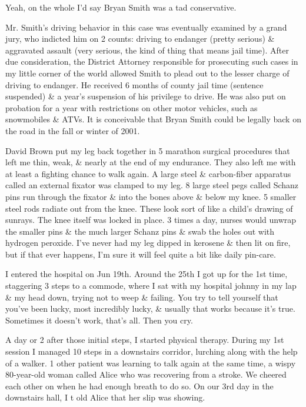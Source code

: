 \documentclass{article}
\numberwithin{equation}{section}
\begin{document}
Yeah, on the whole I'd say Bryan Smith was a tad conservative.

 Mr. Smith's driving behavior in this case was eventually examined by a grand jury, who indicted him on 2 counts: driving to endanger (pretty serious) \& aggravated assault (very serious, the kind of thing that means jail time). After due consideration, the District Attorney responsible for prosecuting such cases in my little corner of the world allowed Smith to plead out to the lesser charge of driving to endanger. He received 6 months of county jail time (sentence suspended) \& a year's suspension of his privilege to drive. He was also put on probation for a year with restrictions on other motor vehicles, such as snowmobiles \& ATVs. It is conceivable that Bryan Smith could be legally back on the road in the fall or winter of 2001.

 David Brown put my leg back together in 5 marathon surgical procedures that left me thin, weak, \& nearly at the end of my endurance. They also left me with at least a fighting chance to walk again. A large steel \& carbon-fiber apparatus called an external fixator was clamped to my leg. 8 large steel pegs called Schanz pins run through the fixator \& into the bones above \& below my knee. 5 smaller steel rods radiate out from the knee. These look sort of like a child's drawing of sunrays. The knee itself was locked in place. 3 times a day, nurses would unwrap the smaller pins \& the much larger Schanz pins \& swab the holes out with hydrogen peroxide. I've never had my leg dipped in kerosene \& then lit on fire, but if that ever happens, I'm sure it will feel quite a bit like daily pin-care.

I entered the hospital on Jun 19th. Around the 25th I got up for the 1st time, staggering 3 steps to a commode, where I sat with my hospital johnny in my lap \& my head down, trying not to weep \& failing. You try to tell yourself that you've been lucky, most incredibly lucky, \& usually that works because it's true. Sometimes it doesn't work, that's all. Then you cry.

A day or 2 after those initial steps, I started physical therapy. During my 1st session I managed 10 steps in a downstairs corridor, lurching along with the help of a walker. 1 other patient was learning to talk again at the same time, a wispy 80-year-old woman called Alice who was recovering from a stroke. We cheered each other on when he had enough breath to do so. On our 3rd day in the downstairs hall, I t old Alice that her slip was showing.
\end{document}
